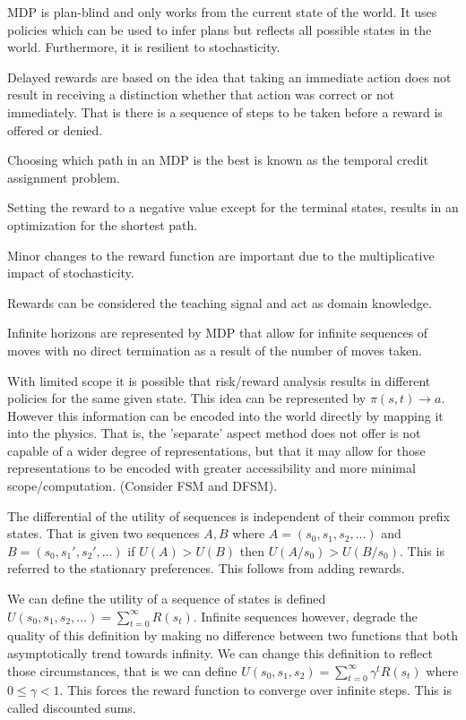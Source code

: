 \documentclass{article}
\begin{document}
MDP is plan-blind and only works from the current state of the world. It uses
policies which can be used to infer plans but reflects all possible states in
the world. Furthermore, it is resilient to stochasticity. 

Delayed rewards are based on the idea that taking an immediate action does not
result in receiving a distinction whether that action was correct or not
immediately. That is there is a sequence of steps to be taken before a reward is 
offered or denied. 

Choosing which path in an MDP is the best is known as the temporal credit
assignment problem. 

Setting the reward to a negative value except for the terminal states, results
in an optimization for the shortest path. 

Minor changes to the reward function are important due to the multiplicative
impact of stochasticity. 

Rewards can be considered the teaching signal and act as domain knowledge. 

Infinite horizons are represented by MDP that allow for infinite sequences of
moves with no direct termination as a result of the number of moves taken. 

With limited scope it is possible that risk/reward analysis results in different
policies for the same given state. This idea can be represented by $\pi(s,t)
\rightarrow a$. However this information can be encoded into the world directly
by mapping it into the physics. That is, the 'separate' aspect method does not
offer is not capable of a wider degree of representations, but that it may allow
for those representations to be encoded with greater accessibility and more 
minimal scope/computation. (Consider FSM and DFSM). 

The differential of the utility of sequences is independent of their common 
prefix states. That is given two sequences $A, B$ where $A = (s_0, s_1, s_2,
\ldots)$ and $B = (s_0, s_1', s_2', \ldots)$ if $U(A) > U(B)$ then $U(A/s_0) > 
U(B/s_0)$. This is referred to the stationary preferences. This follows from
adding rewards. 

We can define the utility of a sequence of states is defined $U(s_0, s_1, s_2,
\ldots) = \sum_{t = 0}^\infty R(s_t)$. Infinite sequences however, degrade the 
quality of this definition by making no difference between two functions that 
both asymptotically trend towards infinity. We can change this definition to 
reflect those circumstances, that is we can define $U(s_0, s_1, s_2) = 
\sum_{t = 0}^\infty \gamma^tR(s_t)$ where $0 \leq \gamma < 1$. This forces the 
reward function to converge over infinite steps. This is called discounted sums.
\end{document}
